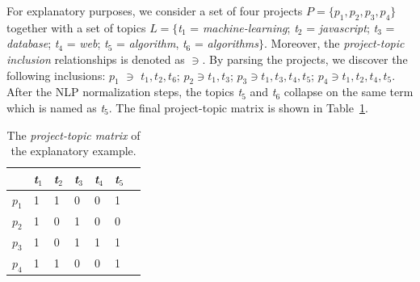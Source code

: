 


For explanatory purposes, we consider a set of four projects 
$P=\{p_1,p_2,p_3,p_4 \}$ together with a set of topics $L=\{$\emph{t$_1$} = 
\emph{machine-learning}; \emph{t$_2$} = \emph{javascript}; \emph{t$_3$} = 
\emph{database}; \emph{t$_4$} = \emph{web}; \emph{t$_5$} = \emph{algorithm}, 
\emph{t$_6$} = \emph{algorithms}$\}$. Moreover, the \emph{project-topic 
inclusion} relationships is denoted as $\ni$. By parsing the projects, we 
discover the following inclusions: $p_1$ $\ni$ $t_1,t_2, t_6$; $p_2 \ni 
t_1,t_3$; $p_3 \ni t_1 ,t_3, t_4, t_5$; $p_4 \ni t_1,t_2,t_4,t_5$. After the 
NLP normalization steps, the topics \emph{t$_5$} and \emph{t$_6$} collapse on 
the same term which is named as \emph{t$_{5}$}. The final project-topic matrix 
is shown in Table~\ref{tab:repo-topic-matrix}. 

\begin{table}[h!]
	\caption{The \emph{project-topic matrix} of the explanatory example.}
	\begin{tabular}{|p{0.5cm}|p{0.5cm}|p{0.5cm}|p{0.5cm}|p{0.5cm}|p{0.5cm}|p{0.5cm}|} \hline
		& \emph{t$_1$} & \emph{t$_2$} & \emph{t$_3$} & \emph{t$_4$} & \emph{t$_{5}$} \\ \hline
		$p_1$ & 1 & 1 & 0 & 0 & 1 \\ \hline
		$p_2$ & 1 & 0 & 1 & 0 & 0 \\ \hline
		$p_3$ & 1 & 0 & 1 & 1 & 1 \\ \hline
		$p_4$ & 1 & 1 & 0 & 0 & 1 \\ \hline
	\end{tabular}
    \label{tab:repo-topic-matrix}
\end{table}




